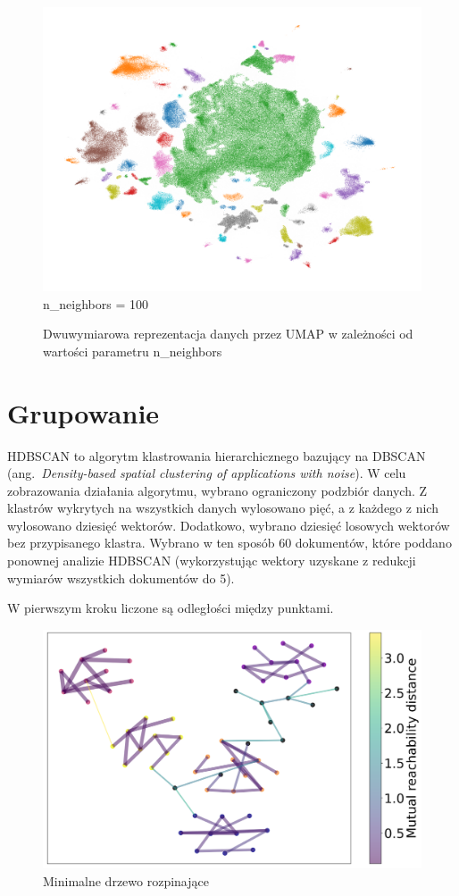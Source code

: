 \begin{figure}[htb]
\begin{minipage}{.33\textwidth}
			\includegraphics[width=\linewidth]{rys04/umap_100_100_100.png}
			n\_neighbors = 100
		\end{minipage}
		\caption{Dwuwymiarowa reprezentacja danych przez UMAP w zależności od wartości parametru n\_neighbors}\label{fig:umap}
	\end{figure}
	

\section{Grupowanie}
	HDBSCAN to algorytm klastrowania hierarchicznego bazujący na DBSCAN (ang.\ \emph{Density-based spatial clustering of applications with noise}).
	W celu zobrazowania działania algorytmu, wybrano ograniczony podzbiór danych.
	Z klastrów wykrytych na wszystkich danych wylosowano pięć, a z każdego z nich wylosowano dziesięć wektorów.
	Dodatkowo, wybrano dziesięć losowych wektorów bez przypisanego klastra.
	Wybrano w ten sposób 60 dokumentów, które poddano ponownej analizie HDBSCAN
		(wykorzystując wektory uzyskane z redukcji wymiarów wszystkich dokumentów do 5).
	
	W pierwszym kroku liczone są odległości między punktami.
	
	\begin{figure}[htb]
		\centering
		\includegraphics[width=0.5\linewidth]{rys04/hdbscan_mst.png}
		\caption{Minimalne drzewo rozpinające}\label{fig:mst}
	\end{figure}
	
